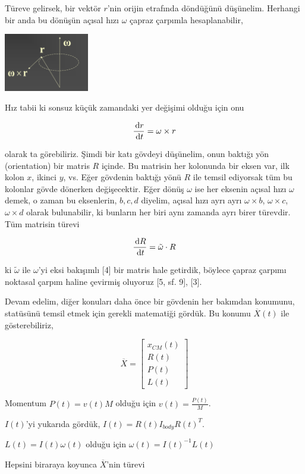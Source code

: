 \documentclass[12pt,fleqn]{article}\usepackage{../../common}
\begin{document}
Türeve gelirsek, bir vektör $r$'nin orijin etrafında döndüğünü
düşünelim. Herhangi bir anda bu dönüşün açısal hızı $\omega$ çapraz çarpımla
hesaplanabilir,

\includegraphics[width=10em]{phy_005_basics_04_03.png}

Hız tabii ki sonsuz küçük zamandaki yer değişimi olduğu için onu

$$
\frac{\,\mathrm{d} r}{\,\mathrm{d} t} = \omega \times r
$$

olarak ta görebiliriz. Şimdi bir katı gövdeyi düşünelim, onun baktığı yön
(orientation) bir matris $R$ içinde. Bu matrisin her kolonunda bir eksen var,
ilk kolon $x$, ikinci $y$, vs. Eğer gövdenin baktığı yönü $R$ ile temsil
ediyorsak tüm bu kolonlar gövde dönerken değişecektir. Eğer dönüş $\omega$ ise
her eksenin açısal hızı $\omega$ demek, o zaman bu eksenlerin, $b,c,d$ diyelim,
açısal hızı ayrı ayrı $\omega \times b$, $\omega \times c$, $\omega \times d$
olarak bulunabilir, ki bunların her biri aynı zamanda ayrı birer türevdir. Tüm
matrisin türevi

$$
\frac{\,\mathrm{d} R}{\,\mathrm{d} t} = \tilde \omega \cdot R
$$

ki $\tilde \omega$ ile $\omega$'yi eksi bakışımlı [4] bir matris hale getirdik,
böylece çapraz çarpımı noktasal çarpım haline çevirmiş oluyoruz [5, sf. 9], [3].

Devam edelim, diğer konuları daha önce bir gövdenin her bakımdan konumunu,
statüsünü temsil etmek için gerekli matematiği gördük. Bu konumu
$\overline{X}(t)$ ile gösterebiliriz,

$$
\overline{X} = \left[\begin{array}{c}
x_{CM}(t) \\ R(t) \\ P(t) \\ L(t)
\end{array}\right]
$$

Momentum $P(t) = v(t) M$ olduğu için $v(t) = \frac{P(t)}{M}$.

$I(t)$'yi yukarıda gördük, $I(t) = R(t) I_{body} R(t)^T$.

$L(t) = I(t) \omega(t)$ olduğu için $\omega(t) = I(t)^{-1} L(t)$

Hepsini biraraya koyunca $\overline{X}$'nin türevi
\end{document}
